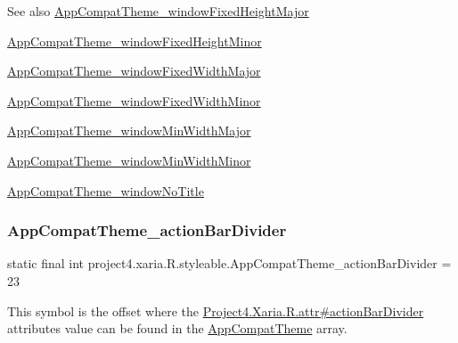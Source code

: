 \begin{DoxySeeAlso}{See also}
\hyperlink{classproject4_1_1xaria_1_1R_1_1styleable_afbfad678390f6ef619822aaa4c394909}{App\+Compat\+Theme\+\_\+window\+Fixed\+Height\+Major} 

\hyperlink{classproject4_1_1xaria_1_1R_1_1styleable_a9110b2aa58050cacc46ad38d156924e2}{App\+Compat\+Theme\+\_\+window\+Fixed\+Height\+Minor} 

\hyperlink{classproject4_1_1xaria_1_1R_1_1styleable_ad301f019de6ddcbce43d7e5d1f6e3e25}{App\+Compat\+Theme\+\_\+window\+Fixed\+Width\+Major} 

\hyperlink{classproject4_1_1xaria_1_1R_1_1styleable_afc006d05a67568d40092e9c8b6d65ca5}{App\+Compat\+Theme\+\_\+window\+Fixed\+Width\+Minor} 

\hyperlink{classproject4_1_1xaria_1_1R_1_1styleable_a1800907132f2a32eb4cf09127ecc7edc}{App\+Compat\+Theme\+\_\+window\+Min\+Width\+Major} 

\hyperlink{classproject4_1_1xaria_1_1R_1_1styleable_af7746fda2052e3559e17aae4ea7bd140}{App\+Compat\+Theme\+\_\+window\+Min\+Width\+Minor} 

\hyperlink{classproject4_1_1xaria_1_1R_1_1styleable_ad3263d106700d1119508ee7eae3c01e2}{App\+Compat\+Theme\+\_\+window\+No\+Title} 
\end{DoxySeeAlso}
\mbox{\label{classproject4_1_1xaria_1_1R_1_1styleable_ad095f54263895a9187adcc505fb74a8f}} 
\subsubsection{\texorpdfstring{App\+Compat\+Theme\+\_\+action\+Bar\+Divider}{AppCompatTheme\_actionBarDivider}}
{\footnotesize\ttfamily static final int project4.\+xaria.\+R.\+styleable.\+App\+Compat\+Theme\+\_\+action\+Bar\+Divider = 23\hspace{0.3cm}{\ttfamily [static]}}

This symbol is the offset where the \hyperlink{}{Project4.\+Xaria.\+R.\+attr\#action\+Bar\+Divider} attribute\textquotesingle{}s value can be found in the \hyperlink{classproject4_1_1xaria_1_1R_1_1styleable_aad8bec413e2350f9404e6ff0e831a85d}{App\+Compat\+Theme} array.

